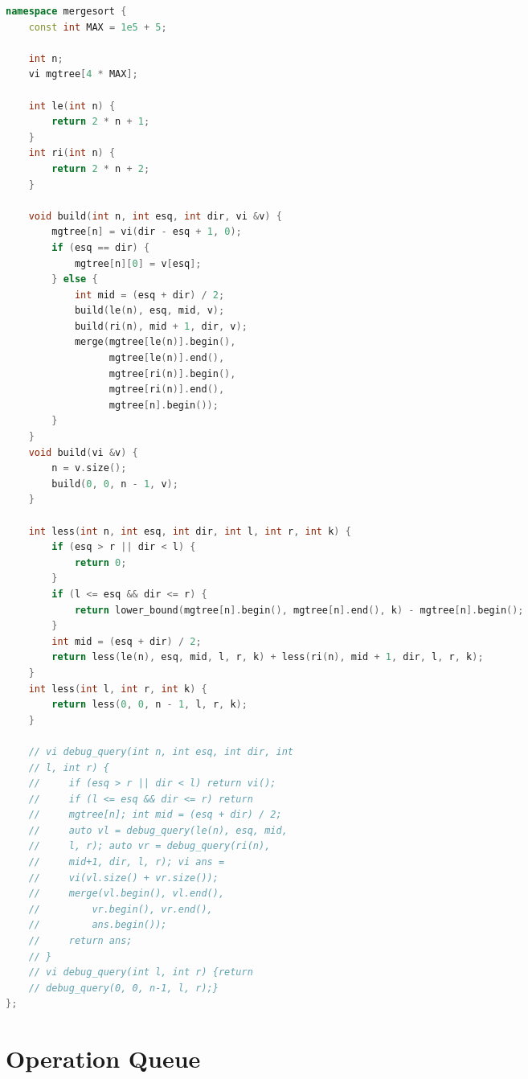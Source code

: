 \documentclass[11pt, a4paper, oneside]{book}
\begin{document}
\begin{multicols}{2}
\begin{lstlisting}[language=C++]
namespace mergesort {
    const int MAX = 1e5 + 5;

    int n;
    vi mgtree[4 * MAX];

    int le(int n) {
        return 2 * n + 1;
    }
    int ri(int n) {
        return 2 * n + 2;
    }

    void build(int n, int esq, int dir, vi &v) {
        mgtree[n] = vi(dir - esq + 1, 0);
        if (esq == dir) {
            mgtree[n][0] = v[esq];
        } else {
            int mid = (esq + dir) / 2;
            build(le(n), esq, mid, v);
            build(ri(n), mid + 1, dir, v);
            merge(mgtree[le(n)].begin(),
                  mgtree[le(n)].end(),
                  mgtree[ri(n)].begin(),
                  mgtree[ri(n)].end(),
                  mgtree[n].begin());
        }
    }
    void build(vi &v) {
        n = v.size();
        build(0, 0, n - 1, v);
    }

    int less(int n, int esq, int dir, int l, int r, int k) {
        if (esq > r || dir < l) {
            return 0;
        }
        if (l <= esq && dir <= r) {
            return lower_bound(mgtree[n].begin(), mgtree[n].end(), k) - mgtree[n].begin();
        }
        int mid = (esq + dir) / 2;
        return less(le(n), esq, mid, l, r, k) + less(ri(n), mid + 1, dir, l, r, k);
    }
    int less(int l, int r, int k) {
        return less(0, 0, n - 1, l, r, k);
    }

    // vi debug_query(int n, int esq, int dir, int
    // l, int r) {
    //     if (esq > r || dir < l) return vi();
    //     if (l <= esq && dir <= r) return
    //     mgtree[n]; int mid = (esq + dir) / 2;
    //     auto vl = debug_query(le(n), esq, mid,
    //     l, r); auto vr = debug_query(ri(n),
    //     mid+1, dir, l, r); vi ans =
    //     vi(vl.size() + vr.size());
    //     merge(vl.begin(), vl.end(),
    //         vr.begin(), vr.end(),
    //         ans.begin());
    //     return ans;
    // }
    // vi debug_query(int l, int r) {return
    // debug_query(0, 0, n-1, l, r);}
};
\end{lstlisting}
\end{multicols}

\hfill

\section{Operation Queue}
\end{document}
